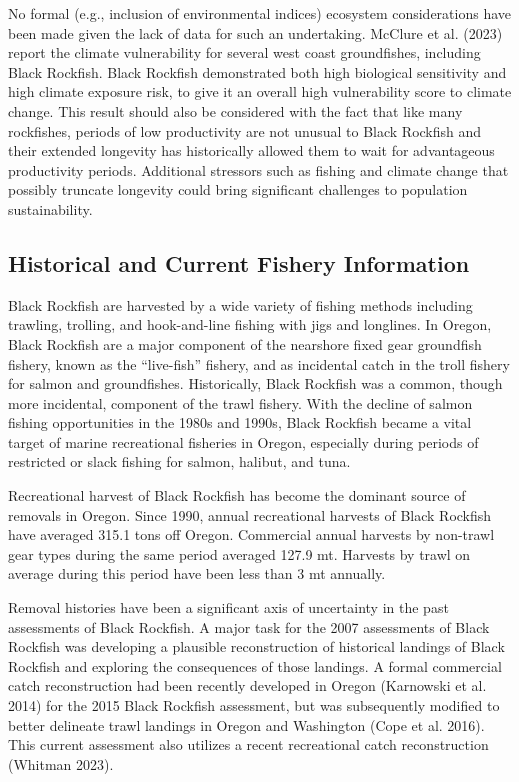 \documentclass[11pt,
  letterpaper,
]{article}
\begin{document}
No formal (e.g., inclusion of environmental indices) ecosystem considerations have been made given the lack of data for such an undertaking. McClure et al. (2023) report the climate vulnerability for several west coast groundfishes, including Black Rockfish. Black Rockfish demonstrated both high biological sensitivity and high climate exposure risk, to give it an overall high vulnerability score to climate change. This result should also be considered with the fact that like many rockfishes, periods of low productivity are not unusual to Black Rockfish and their extended longevity has historically allowed them to wait for advantageous productivity periods. Additional stressors such as fishing and climate change that possibly truncate longevity could bring significant challenges to population sustainability.

\hypertarget{historical-and-current-fishery-information}{%
\subsection{Historical and Current Fishery Information}\label{historical-and-current-fishery-information}}

Black Rockfish are harvested by a wide variety of fishing methods including trawling, trolling, and hook-and-line fishing with jigs and longlines. In Oregon, Black Rockfish are a major component of the nearshore fixed gear groundfish fishery, known as the ``live-fish'' fishery, and as incidental catch in the troll fishery for salmon and groundfishes. Historically, Black Rockfish was a common, though more incidental, component of the trawl fishery. With the decline of salmon fishing opportunities in the 1980s and 1990s, Black Rockfish became a vital target of marine recreational fisheries in Oregon, especially during periods of restricted or slack fishing for salmon, halibut, and tuna.

Recreational harvest of Black Rockfish has become the dominant source of removals in Oregon. Since 1990, annual recreational harvests of Black Rockfish have averaged 315.1 tons off Oregon. Commercial annual harvests by non-trawl gear types during the same period averaged 127.9 mt. Harvests by trawl on average during this period have been less than 3 mt annually.

Removal histories have been a significant axis of uncertainty in the past assessments of Black Rockfish. A major task for the 2007 assessments of Black Rockfish was developing a plausible reconstruction of historical landings of Black Rockfish and exploring the consequences of those landings. A formal commercial catch reconstruction had been recently developed in Oregon (Karnowski et al. 2014) for the 2015 Black Rockfish assessment, but was subsequently modified to better delineate trawl landings in Oregon and Washington (Cope et al. 2016). This current assessment also utilizes a recent recreational catch reconstruction (Whitman 2023).
\end{document}
